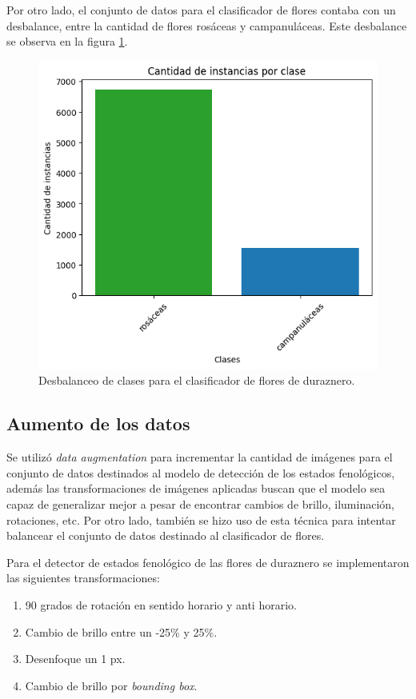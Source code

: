 Por otro lado, el conjunto de datos para el clasificador de flores contaba con un desbalance, entre la cantidad de flores rosáceas y campanuláceas. Este desbalance se observa en la figura \ref{fig:desbalanceoClass}.

\begin{figure}[ht]
	\centering
	\includegraphics[scale=.53]{./Figures/tipodeflor_desbalance.png}
	\caption{Desbalanceo de clases para el clasificador de flores de duraznero.}
	\label{fig:desbalanceoClass}
\end{figure}
\newpage
\subsection{Aumento de los datos}

Se utilizó \textit{data augmentation} para incrementar la cantidad de imágenes para el conjunto de datos destinados al modelo de detección de los estados fenológicos, además las transformaciones de imágenes aplicadas buscan que el modelo sea capaz de generalizar mejor a pesar de encontrar cambios de brillo, iluminación, rotaciones, etc. Por otro lado, también se hizo uso de esta técnica para intentar balancear el conjunto de datos destinado al clasificador de flores.

Para el detector de estados fenológico de las flores de duraznero se implementaron las siguientes transformaciones:

\begin{enumerate}
	\item 90 grados de rotación en sentido horario y anti horario.
	\item Cambio de brillo entre un -25\% y 25\%. 
	\item Desenfoque un 1 px.
	\item Cambio de brillo por \textit{bounding box}.
\end{enumerate}

